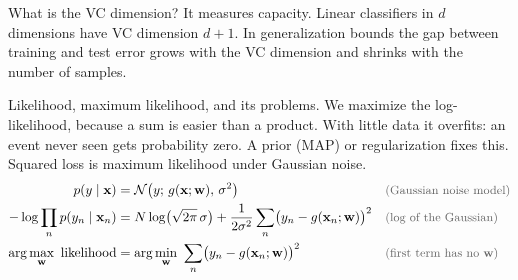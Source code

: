 \begin{qabox}{What is the VC dimension?}
\explain It measures capacity. Linear classifiers in $d$ dimensions have VC dimension $d+1$. In
generalization bounds the gap between training and test error grows with the VC dimension and
shrinks with the number of samples.
\end{qabox}

\begin{qabox}{Likelihood, maximum likelihood, and its problems.}
\explain We maximize the log-likelihood, because a sum is easier than a product. With little data
it overfits: an event never seen gets probability zero. A prior (MAP) or regularization fixes
this. Squared loss is maximum likelihood under Gaussian noise.
\derive
\begin{align*}
p(y\mid\mathbf{x}) &= \mathcal{N}\bigl(y;\,g(\mathbf{x};\mathbf{w}),\,\sigma^2\bigr) \why{Gaussian noise model} \\
-\log\prod_n p(y_n\mid\mathbf{x}_n) &= N\log\bigl(\sqrt{2\pi}\,\sigma\bigr) + \frac{1}{2\sigma^2}\sum_n\bigl(y_n - g(\mathbf{x}_n;\mathbf{w})\bigr)^2 \why{log of the Gaussian} \\
\arg\max_{\mathbf{w}}\ \text{likelihood} &= \arg\min_{\mathbf{w}}\ \sum_n\bigl(y_n - g(\mathbf{x}_n;\mathbf{w})\bigr)^2 \why{first term has no $\mathbf{w}$}
\end{align*}
\end{qabox}

